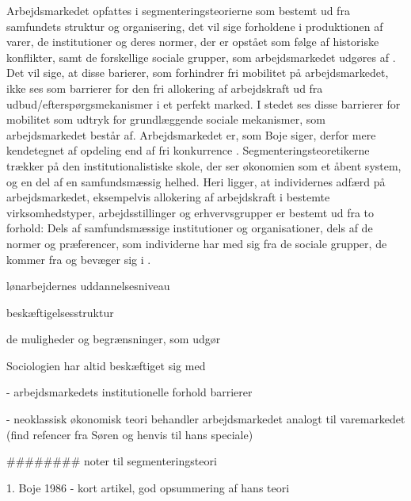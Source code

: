 Arbejdsmarkedet opfattes i segmenteringsteorierne som bestemt ud fra samfundets struktur og organisering, det vil sige forholdene i produktionen af varer, de institutioner og deres normer, der er opstået som følge af historiske konflikter, samt de forskellige sociale grupper, som arbejdsmarkedet udgøres af \parencite[9]{Boje1985}. Det  vil sige, at disse barierer, som forhindrer fri mobilitet på arbejdsmarkedet, ikke ses som barrierer for den fri allokering af arbejdskraft ud fra udbud/efterspørgsmekanismer i et perfekt marked. I stedet ses disse barrierer for mobilitet som udtryk for grundlæggende sociale mekanismer, som arbejdsmarkedet består af. Arbejdsmarkedet er, som Boje siger, derfor mere kendetegnet af opdeling end af fri konkurrence \parencite[8]{Boje1985}. Segmenteringsteoretikerne trækker på den institutionalistiske skole, der ser økonomien som et åbent system, og en del af en samfundsmæssig helhed. Heri ligger, at individernes adfærd på arbejdsmarkedet, eksempelvis allokering af arbejdskraft i bestemte virksomhedstyper, arbejdsstillinger og erhvervsgrupper er bestemt ud fra to forhold: Dels af samfundsmæssige institutioner og organisationer, dels af de normer og præferencer, som individerne har med sig fra de sociale grupper, de kommer fra og bevæger sig i \parencite[9]{Boje1985}. 





lønarbejdernes uddannelsesniveau

beskæftigelsesstruktur






 de muligheder og begrænsninger, som udgør 










Sociologien har altid beskæftiget sig med



- arbejdsmarkedets institutionelle forhold barrierer 





- neoklassisk økonomisk teori behandler arbejdsmarkedet analogt til varemarkedet (find refencer fra Søren og henvis til hans speciale)





######## noter til segmenteringsteori 

1. Boje 1986 - kort artikel, god opsummering af hans teori

